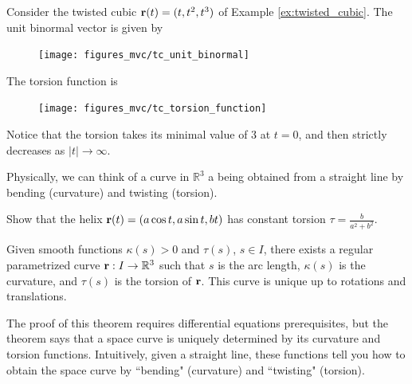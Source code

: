 \documentclass[12pt,letterpaper,reqno]{article}
\numberwithin{equation}{section}
\newcommand{\R}{\ensuremath{\mathbb R}}
\newcommand{\bbr}{{\bf r}}
\begin{document}
{\begin{example}
Consider the twisted cubic $\bbr(t)=(t,t^2,t^3)$ of Example	\ref{ex:twisted_cubic}. The unit binormal vector is given by 

\begin{figure}[h]
	\begin{center}
		\texttt{[image: figures\_mvc/tc\_unit\_binormal]}
	\end{center}
\end{figure}

The torsion function is

\begin{figure}[h]
	\begin{center}
		\texttt{[image: figures\_mvc/tc\_torsion\_function]}
	\end{center}
\end{figure}

Notice that the torsion takes its minimal value of 3 at $t=0$, and then strictly decreases as $|t| \to \infty$.
\end{example}

Physically, we can think of a curve in $\R^3$ a being obtained from a straight line by bending (curvature) and twisting (torsion).

\begin{exercise}
Show that the helix $\bbr(t)=(a\cos t,a\sin t, bt)$ has constant torsion $\tau=\frac{b}{a^2+b^2}$.	
\end{exercise}

\begin{thm}
		Given smooth functions $\kappa(s)>0$ and $\tau(s)$, $s \in I$, there exists a regular parametrized curve $\bbr:I \to \R^3$ such that $s$ is the arc length, $\kappa(s)$ is the curvature, and $\tau(s)$ is the torsion of $\bbr$. This curve is unique up to rotations and translations.
\end{thm}

The proof of this theorem requires differential equations prerequisites, but the theorem says that a space curve is uniquely determined by its curvature and torsion functions. Intuitively, given a straight line, these functions tell you how to obtain the space curve by ``bending" (curvature) and ``twisting" (torsion).

}
\end{document}
